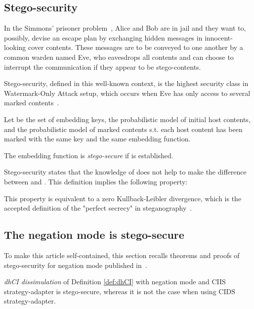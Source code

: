 \documentclass{comjnl}
\begin{document}
\subsection{Stego-security}\label{sub:stegosecurity}


In the Simmons' prisoner problem~\cite{Simmons83}, Alice and Bob are in jail and
they want to,  possibly, devise an escape plan by  exchanging hidden messages in
innocent-looking  cover contents.  These  messages  are to  be  conveyed to  one
another by a common warden named Eve, who eavesdrops all contents and can choose
to interrupt the communication if they appear to be stego-contents.

Stego-security,  defined in  this well-known  context, is  the  highest security
class in Watermark-Only  Attack setup, which occurs when Eve  has only access to
several marked contents~\cite{Cayre2008}.


Let  be the set of embedding keys,  the probabilistic model of
 initial  host contents,  and  the  probabilistic model  of 
marked contents s.t. each host  content has  been marked
with the same key  and the same embedding function.

\begin{definition}
\label{Def:Stego-security}  The embedding  function  is \emph{stego-secure}
if   is established.
\end{definition}







 Stego-security  states that  the knowledge  of   does  not help  to make  the
 difference  between  and  .  This  definition implies  the following
 property:
  
 This property is equivalent to  a zero Kullback-Leibler divergence, which is the
 accepted definition of the "perfect secrecy" in steganography~\cite{Cachin2004}.


\subsection{The negation mode is stego-secure}
To make this article self-contained, this section recalls theorems and proofs of stego-security for negation mode published in~\cite{gfb10:ip}.

\begin{proposition} \emph{dhCI dissimulation}  of Definition \ref{def:dhCI} with
negation mode and  CIIS strategy-adapter is stego-secure, whereas  it is not the
case when using CIDS strategy-adapter.
\end{proposition}
\end{document}
